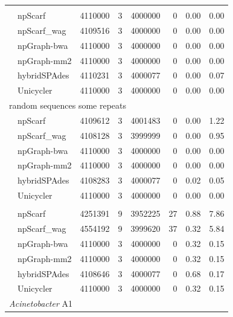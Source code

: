 \documentclass[10pt,twocolumn,twoside]{genpaper}
\begin{document}
\begin{longtable}[!hpt]{llcrrrrr}
\rowcolor{Gray}
\multicolumn{8}{l}{random sequences no repeats} \\* %
\nobreakmidrule
\rowcolor{Gray}
& npScarf &  4110000 &  3  &  4000000  &  0  & 0.00  & 0.00\\*
\rowcolor{Gray}
& npScarf\_wag & 4109516  &  3  &  4000000  &  0  & 0.00  & 0.00\\*
\rowcolor{Gray}
& npGraph-bwa & 4110000  &  3  &  4000000  &  0  & 0.00  & 0.00\\*
\rowcolor{Gray}
& npGraph-mm2 & 4110000  &  3  &  4000000  &  0  & 0.00  & 0.00\\*
\rowcolor{Gray}
& hybridSPAdes & 4110231  &  3  & 4000077   &  0  & 0.00  &  0.07\\*
\rowcolor{Gray}
& Unicycler & 4110000  &  3  &  4000000  &  0  & 0.00  &  0.00\\
\hline
\multicolumn{8}{l}{random sequences some repeats} \\* %
\nobreakmidrule
& npScarf & 4109612  &  3  &  4001483  &  0  &  0.00 &  1.22\\*
& npScarf\_wag & 4108128  &  3 &  3999999  &  0  &  0.00 &  0.95\\*
& npGraph-bwa & 4110000  &  3  &  4000000  &  0 &  0.00 &  0.00\\*
& npGraph-mm2 &  4110000 &  3  &   4000000 & 0  & 0.00  &  0.00\\*
& hybridSPAdes & 4108283  &  3  &  4000077  &  0  & 0.02  & 0.05\\*
& Unicycler &  4110000 &  3 & 4000000  &  0 & 0.00  &  0.00\\
\hline
\rowcolor{Gray}
\multicolumn{8}{l}{random sequences many repeats} \\* %
\nobreakmidrule
\rowcolor{Gray}
& npScarf &  4251391 &  9  &  3952225  &  27  & 0.88  & 7.86\\*
\rowcolor{Gray}
& npScarf\_wag &  4554192 &  9  &  3999620  &  37  & 0.32  & 5.84\\*
\rowcolor{Gray}
& npGraph-bwa & 4110000  &  3  &  4000000  &  0  &  0.32 & 0.15\\*
\rowcolor{Gray}
& npGraph-mm2 &  4110000 &  3  &  4000000  &  0  & 0.32  & 0.15\\*
\rowcolor{Gray}
& hybridSPAdes & 4108646  &  3  &  4000077  &  0  &  0.68 &  0.17\\*
\rowcolor{Gray}
& Unicycler & 4110000  &  3  &  4000000  &  0  &  0.32  & 0.15  \\
\hline
\multicolumn{8}{l}{\emph{Acinetobacter} A1} \\* %

\end{longtable}
\end{document}
